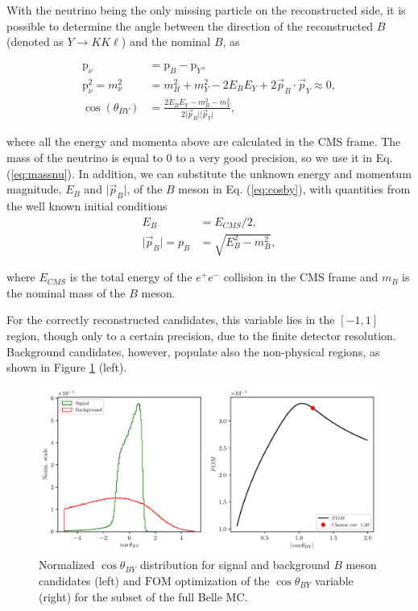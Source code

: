 With the neutrino being the only missing particle on the reconstructed side, it is possible to determine the angle between the direction of the reconstructed $B$ (denoted as $Y \to K K \ell$) and the nominal $B$, as

\begin{align}
\mathrm{p}_\nu &= \mathrm{p}_B - \mathrm{p}_{Y}, \\
\label{eq:massnu}
\mathrm{p}_\nu^2 = m_\nu^2 &= m_B^2 + m_Y^2 - 2E_BE_Y + 2\vec{p}_B \cdot \vec{p}_Y \approx 0, \\ 
\label{eq:cosby}
\cos \left(\theta_{BY}\right) &= \frac{2E_BE_Y - m_B^2 - m_Y^2}{2\vert \vec{p}_B \vert \vert \vec{p}_Y\vert},
\end{align} 

where all the energy and momenta above are calculated in the CMS frame. The mass of the neutrino is equal to 0 to a very good precision, so we use it in Eq. (\ref{eq:massnu}). In addition, we can substitute the unknown energy and momentum magnitude, $E_B$ and $\vert \vec{p}_B \vert$, of the $B$ meson in Eq. (\ref{eq:cosby}), with quantities from the well known initial conditions
\begin{align}
E_B &= E_{CMS} / 2,\\
\vert \vec{p}_B \vert = p_B &= \sqrt{E_B^2 - m_B^2},
\end{align} 

where $E_{CMS}$ is the total energy of the $e^+e^-$ collision in the CMS frame and $m_B$ is the nominal mass of the $B$ meson. 

For the correctly reconstructed candidates, this variable lies in the $[-1,1]$ region, though only to a certain precision, due to the finite detector resolution. Background candidates, however, populate also the non-physical regions, as shown in Figure \ref{fig:cosby} (left). 

\begin{figure}[H]
	\centering
	\captionsetup{width=.8\linewidth}
	\includegraphics[width=\linewidth]{fig/cosBY}
	\caption{Normalized $\cos \theta_{BY}$ distribution for signal and background $B$ meson candidates (left) and $\mathrm{FOM}$ optimization of the $\cos \theta_{BY}$ variable (right) for the subset of the full Belle MC.}
	\label{fig:cosby}
\end{figure}


